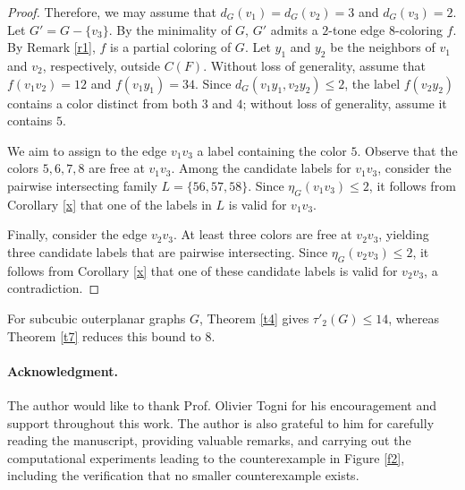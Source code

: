 \documentclass[12pt]{article}
\theoremstyle{plain}
\numberwithin{theorem}{section}
\numberwithin{conjecture}{section}
\numberwithin{corollary}{section}
\numberwithin{example}{section}
\numberwithin{lemma}{section}
\numberwithin{proposition}{section}
\numberwithin{problem}{section}
\numberwithin{remark}{section}
\numberwithin{claim}{theorem}
\numberwithin{definition}{section}
\begin{document}
\begin{proof}
\noindent Therefore, we may assume that $d_G(v_1)=d_G(v_2)=3$ and $d_G(v_3)=2$. Let $G'=G-\{v_3\}$. By the minimality of $G$, $G'$ admits a $2$-tone edge $8$-coloring $f$. By Remark \ref{r1}, $f$ is a partial coloring of $G$. Let $y_1$ and $y_2$ be the neighbors of $v_1$ and $v_2$, respectively, outside $C(F)$. Without loss of generality, assume that $f(v_1v_2)=12$ and $f(v_1y_1)=34$. Since $d_G(v_1y_1, v_2y_2)\le 2$, the label $f(v_2y_2)$ contains a color distinct from both $3$ and $4$; without loss of generality, assume it contains $5$.

\noindent We aim to assign to the edge $v_1v_3$ a label containing the color $5$. Observe that the colors $5,6,7,8$ are free at $v_1v_3$. Among the candidate labels for $v_1v_3$, consider the pairwise intersecting family $L=\{56,57,58\}$. Since $\eta_G(v_1v_3)\le 2$, it follows from Corollary \ref{x} that one of the labels in $L$ is valid for $v_1v_3$.

\noindent Finally, consider the edge $v_2v_3$. At least three colors are free at $v_2v_3$, yielding three candidate labels that are pairwise intersecting. Since $\eta_G(v_2v_3)\le 2$, it follows from Corollary \ref{x} that one of these candidate labels is valid for $v_2v_3$, a contradiction.\end{proof}

For subcubic outerplanar graphs $G$, Theorem \ref{t4} gives $\tau'_2(G)\le 14$, whereas Theorem \ref{t7} reduces this bound to $8$.

\paragraph{Acknowledgment.}
The author would like to thank Prof. Olivier Togni for his encouragement and support throughout this work. The author is also grateful to him for carefully reading the manuscript, providing valuable remarks, and carrying out the computational experiments leading to the counterexample in Figure \ref{f2}, including the verification that no smaller counterexample exists.
\end{document}
